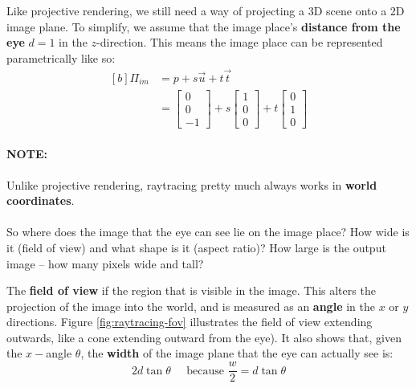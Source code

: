 \documentclass{article}
\begin{document}
Like projective rendering, we still need a way of projecting a 3D scene onto a 2D image plane. To simplify, we assume that the image place's \textbf{distance from the eye} $d = 1$ in the $z$-direction. This means the image place can be represented parametrically like so:
\begin{equation}
\begin{aligned}[b]
	\Pi_{im} &= p + s\vec{u} + t\vec{t} \\
	&= \left[ \begin{matrix} 0 \\ 0 \\ -1 \end{matrix} \right]
	+ s \left[ \begin{matrix} 1 \\ 0 \\ 0 \end{matrix} \right]
	+ t \left[ \begin{matrix} 0 \\ 1 \\ 0 \end{matrix} \right]
	\label{eq:parametric-raytracing-image-plane}
\end{aligned}
\end{equation}

\paragraph{\textbf{NOTE: }} Unlike projective rendering, raytracing pretty much always works in \textbf{world coordinates}.
\paragraph{}

So where does the image that the eye can see lie on the image place? How wide is it (field of view) and what shape is it (aspect ratio)? How large is the output image -- how many pixels wide and tall?

The \textbf{field of view} if the region that is visible in the image. This alters the projection of the image into the world, and is measured as an \textbf{angle} in the $x$ or $y$ directions. Figure \ref{fig:raytracing-fov} illustrates the field of view extending outwards, like a cone extending outward from the eye). It also shows that, given the $x-$angle $\theta$, the \textbf{width} of the image plane that the eye can actually see is:
\begin{equation}
	2 d \tan \theta \;\;\;\;\; \text{because }\frac{w}{2} = d \tan \theta
\end{equation}
\end{document}
